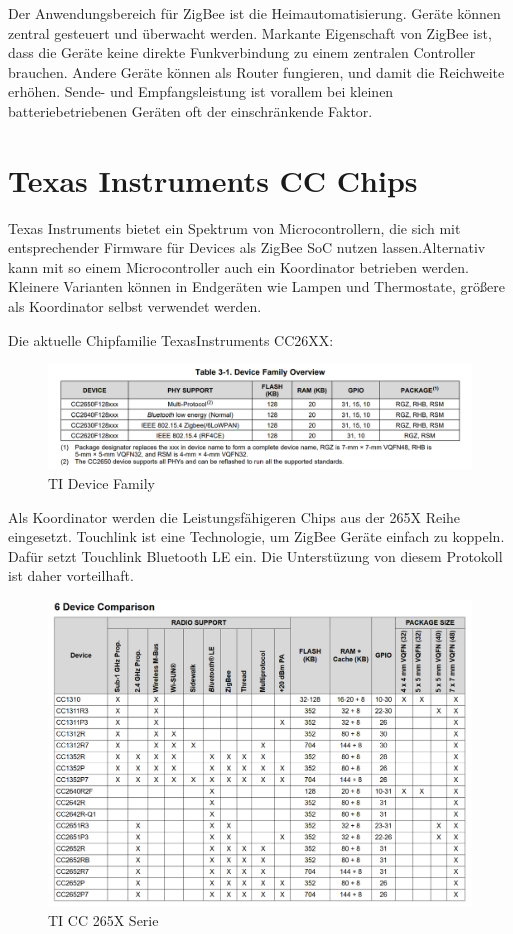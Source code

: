 Der Anwendungsbereich für ZigBee ist die Heimautomatisierung. Geräte können zentral gesteuert und überwacht werden. 
Markante Eigenschaft von ZigBee ist, dass die Geräte keine direkte Funkverbindung
zu einem zentralen Controller brauchen. Andere Geräte können als Router fungieren, und damit die Reichweite erhöhen. Sende- und Empfangsleistung
ist vorallem bei kleinen batteriebetriebenen Geräten oft der einschränkende Faktor.


\section{Texas Instruments CC Chips}

Texas Instruments bietet ein Spektrum von Microcontrollern, die sich mit entsprechender Firmware für Devices als ZigBee SoC 
nutzen lassen.Alternativ kann mit so einem Microcontroller auch ein Koordinator betrieben werden. Kleinere Varianten können in Endgeräten wie Lampen und Thermostate, 
größere als Koordinator selbst verwendet werden.

Die aktuelle Chipfamilie TexasInstruments CC26XX:

\begin{figure}[H]
  \centering
  \includegraphics[width=1\textwidth]{media/table26xx.png}
  \caption{TI Device Family}
\end{figure}

Als Koordinator werden die Leistungsfähigeren Chips aus der 265X Reihe eingesetzt. Touchlink ist eine Technologie, um ZigBee Geräte einfach zu koppeln. Dafür setzt
Touchlink Bluetooth LE ein. Die Unterstüzung von diesem Protokoll ist daher vorteilhaft.

\begin{figure}[H]
  \centering
  \includegraphics[width=1\textwidth]{media/table265x.png}
  \caption{TI CC 265X Serie}
\end{figure}

